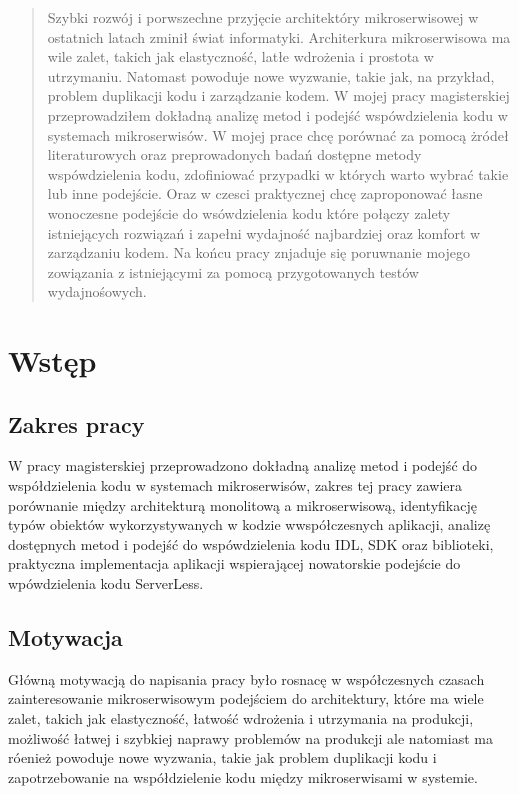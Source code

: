\documentclass[runningheads,12pt]{llncs} \usepackage{graphicx} \usepackage{todonotes} \usepackage{fancyhdr} \usepackage{lipsum} \usepackage[T1]{fontenc} \usepackage[provide=*,english,polish]{babel}
\begin{document}
\newpage

 \begin{abstract} Szybki rozwój i porwszechne przyjęcie architektóry mikroserwisowej w ostatnich latach zminił świat informatyki. Architerkura mikroserwisowa ma wile zalet, takich jak elastyczność, latłe wdrożenia i prostota w utrzymaniu. Natomast powoduje nowe wyzwanie, takie jak, na przykład, problem duplikacji kodu i zarządzanie kodem. W mojej pracy magisterskiej przeprowadziłem dokładną analizę metod i podejść wspówdzielenia kodu w systemach mikroserwisów. W mojej prace chcę porównać za pomocą żródeł literaturowych oraz preprowadonych badań dostępne metody wspówdzielenia kodu, zdofiniować przypadki w których warto wybrać takie lub inne podejście. Oraz w czesci praktycznej chcę zaproponować łasne wonoczesne podejście do wsówdzielenia kodu które połączy zalety istniejących rozwiązań i zapełni wydajność najbardziej oraz komfort w zarządzaniu kodem. Na końcu pracy znjaduje się poruwnanie mojego zowiązania z istniejącymi za pomocą przygotowanych testów wydajnośowych.  \end{abstract}

\newpage

\tableofcontents

\newpage

\section{Wstęp} 

\subsection{Zakres pracy} W pracy magisterskiej przeprowadzono dokładną analizę metod i podejść do współdzielenia kodu w systemach mikroserwisów, zakres tej pracy zawiera porównanie między architekturą monolitową a mikroserwisową, identyfikację typów obiektów wykorzystywanych w kodzie wwspółczesnych aplikacji, analizę dostępnych metod i podejść do wspówdzielenia kodu IDL, SDK oraz biblioteki, praktyczna implementacja aplikacji wspierającej nowatorskie podejście do wpówdzielenia kodu ServerLess.

\subsection{Motywacja} Główną motywacją do napisania pracy było rosnacę w współczesnych czasach zainteresowanie mikroserwisowym podejściem do architektury, które ma wiele zalet, takich jak elastyczność, łatwość wdrożenia i utrzymania na produkcji, możliwość łatwej i szybkiej naprawy problemów na produkcji ale natomiast ma róenież powoduje nowe wyzwania, takie jak problem duplikacji kodu i zapotrzebowanie na współdzielenie kodu między mikroserwisami w systemie.
\end{document}
